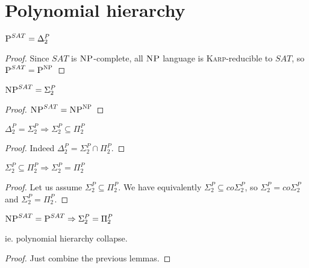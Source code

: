 \section{Polynomial hierarchy}

\begin{lemma}
    $\P^{SAT} = \Delta_2^P$
\end{lemma}
\begin{proof}
    Since $SAT$ is $\NP$-complete, all $\NP$ language is \textsc{Karp}-reducible to $SAT$, so $\P^{SAT} = \P^\NP$
\end{proof}

\begin{lemma}
    $\NP^{SAT} = \Sigma_2^P$
\end{lemma}
\begin{proof}
    $\NP^{SAT} = \NP^\NP$
\end{proof}

\begin{lemma}
    $\Delta_2^P = \Sigma_2^P \Rightarrow \Sigma_2^P \subseteq \Pi_2^P$
\end{lemma}
\begin{proof}
    Indeed $\Delta_2^P = \Sigma_2^P \cap \Pi_2^P$.
\end{proof}

\begin{lemma}
    $\Sigma_2^P \subseteq \Pi_2^P \Rightarrow \Sigma_2^P = \Pi_2^P$
\end{lemma}
\begin{proof}
    Let us assume $\Sigma_2^P \subseteq \Pi_2^P$. We have equivalently $\Sigma_2^P \subseteq co\Sigma_2^P$, so $\Sigma_2^P = co\Sigma_2^P$ and $\Sigma_2^P = \Pi_2^P$.
\end{proof}

\begin{thm}
    $\NP^{SAT}=\P^{SAT} \Rightarrow \Sigma_2^P = \Pi_2^P$
    
    ie. polynomial hierarchy collapse.
\end{thm}
\begin{proof}
    Just combine the previous lemmas.
\end{proof}


